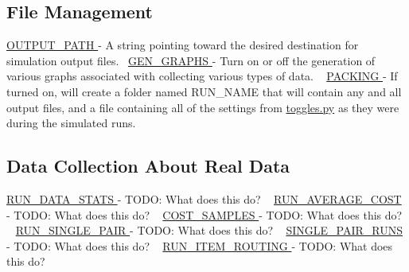 \hypertarget{toggles_file}{}\subsection{File Management}\label{toggles_file}
\hyperlink{namespacedynamicfilterapp_1_1toggles_a04644ded1d5e3fc8bd58a411209b7886}{O\+U\+T\+P\+U\+T\+\_\+\+P\+A\+TH } -\/ A string pointing toward the desired destination for simulation output files.~\newline
 \hyperlink{namespacedynamicfilterapp_1_1toggles_a57c1e3f291181d680f3ee118fa5c4ab8}{G\+E\+N\+\_\+\+G\+R\+A\+P\+HS } -\/ Turn on or off the generation of various graphs associated with collecting various types of data. ~\newline
 \hyperlink{namespacedynamicfilterapp_1_1toggles_a23735ccf05ebd9212e9ebaab8f652507}{P\+A\+C\+K\+I\+NG } -\/ If turned on, will create a folder named R\+U\+N\+\_\+\+N\+A\+ME that will contain any and all output files, and a file containing all of the settings from \hyperlink{toggles_8py}{toggles.\+py} as they were during the simulated runs. ~\newline
 \hypertarget{toggles_data}{}\subsection{Data Collection About Real Data}\label{toggles_data}
\hyperlink{namespacedynamicfilterapp_1_1toggles_a36bc09bc8fbde0df2ea1c5d9ed0cf135}{R\+U\+N\+\_\+\+D\+A\+T\+A\+\_\+\+S\+T\+A\+TS } -\/ T\+O\+DO\+: What does this do? ~\newline
 \hyperlink{namespacedynamicfilterapp_1_1toggles_a21f2f0f4c6df7faefb843dd318af3452}{R\+U\+N\+\_\+\+A\+V\+E\+R\+A\+G\+E\+\_\+\+C\+O\+ST } -\/ T\+O\+DO\+: What does this do? ~\newline
 \hyperlink{namespacedynamicfilterapp_1_1toggles_a134ac33ad7706cd6a24fda5b63c73c65}{C\+O\+S\+T\+\_\+\+S\+A\+M\+P\+L\+ES } -\/ T\+O\+DO\+: What does this do? ~\newline
 \hyperlink{namespacedynamicfilterapp_1_1toggles_ab61137c2de5f99b09789a6e76b7cda4c}{R\+U\+N\+\_\+\+S\+I\+N\+G\+L\+E\+\_\+\+P\+A\+IR } -\/ T\+O\+DO\+: What does this do? ~\newline
 \hyperlink{namespacedynamicfilterapp_1_1toggles_a70d4dc65db288020e23ca213cd97c0f8}{S\+I\+N\+G\+L\+E\+\_\+\+P\+A\+I\+R\+\_\+\+R\+U\+NS } -\/ T\+O\+DO\+: What does this do? ~\newline
 \hyperlink{namespacedynamicfilterapp_1_1toggles_a41d76408f27c5889dc3f40f066583a9f}{R\+U\+N\+\_\+\+I\+T\+E\+M\+\_\+\+R\+O\+U\+T\+I\+NG } -\/ T\+O\+DO\+: What does this do? ~\newline
